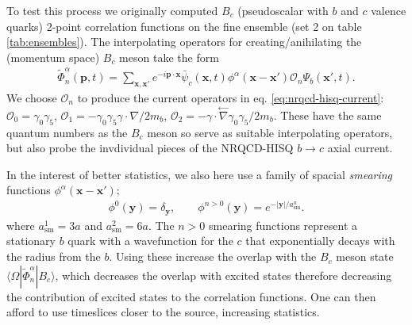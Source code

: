 
To test this process we originally computed $B_c$ (pseudoscalar with $b$ and $c$ valence quarks) 2-point correlation functions on the fine ensemble (set 2 on table \ref{tab:ensembles}). The interpolating operators for creating/anihilating the (momentum space) $B_c$ meson take the form
\begin{align}
  \tilde{\Phi}_n^{\alpha}(\textbf{p},t) = \sum_{\textbf{x},\textbf{x}'} e^{-i\textbf{p}\cdot\textbf{x}} \bar{\psi}_c(\textbf{x},t) \phi^{\alpha}(\textbf{x}-\textbf{x}')\mathcal{O}_n \Psi_b(\textbf{x}',t).
\end{align}
We choose $\mathcal{O}_n$ to produce the current operators in eq. \eqref{eq:nrqcd-hisq-current}: $\mathcal{O}_0 = \gamma_0\gamma_5$, $\mathcal{O}_1 = -\gamma_0\gamma_5 \gamma\cdot \nabla /2m_b$, $\mathcal{O}_2 = - \gamma\cdot \stackrel{\leftarrow}{\nabla} \gamma_0\gamma_5  /2m_b$. These have the same quantum numbers as the $B_c$ meson so serve as suitable interpolating operators, but also probe the invdividual pieces of the NRQCD-HISQ $b\to c$ axial current.

In the interest of better statistics, we also here use a family of spacial {\it{smearing}} functions $\phi^{\alpha}({\textbf{x}}-{\textbf{x}}')$;
\begin{align}
  \phi^0({\textbf{y}}) = \delta_{\textbf{y}},\quad\quad
  \phi^{n>0}({\textbf{y}}) = e^{-|{\textbf{y}}|/a^n_{\text{sm}}}.
  \label{eq:smearings}
\end{align}
where $a^1_{\text{sm}} = 3a$ and $a^2_{\text{sm}} = 6a$. The $n>0$ smearing functions represent a stationary $b$ quark with a wavefunction for the $c$ that exponentially decays with the radius from the $b$. Using these increase the overlap with the $B_c$ meson state $\langle \Omega | \tilde{\Phi}_n^{\alpha}|B_c\rangle$, which decreases the overlap with excited states therefore decreasing the contribution of excited states to the correlation functions. One can then afford to use timeslices closer to the source, increasing statistics.

